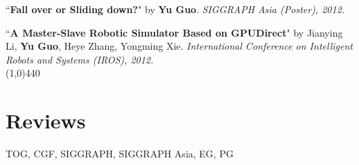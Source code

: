 \documentclass[margin,line]{resume}
\begin{document}
\begin{resume}
	\vspace{-5mm}
	
	``\textbf{Fall over or Sliding down?}" 
	by \textbf{Yu Guo}.
	\textsl{SIGGRAPH Asia (Poster), 2012.}\\
	
	\vspace{-5mm}
	
	``\textbf{A Master-Slave Robotic Simulator Based on GPUDirect}" 
	by Jianying Li, \textbf{Yu Guo}, Heye Zhang, Yongming Xie.
	\textsl{International Conference on Intelligent Robots and Systems (IROS), 2012.}\\





    \vspace{-5.0mm}
    \line(1,0){440}
    \vspace{-5.0mm}

    \section{\mysidestyle Reviews}

    TOG, CGF, SIGGRAPH, SIGGRAPH Asia, EG, PG                    \\




\end{resume}
\end{document}
